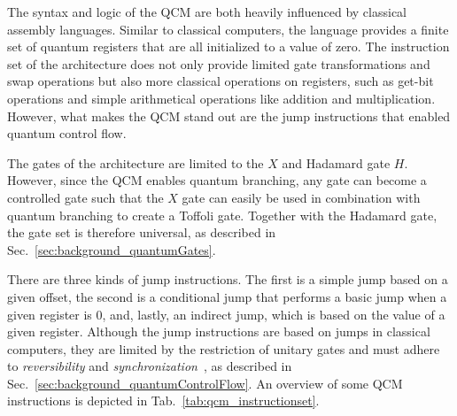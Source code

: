 The syntax and logic of the QCM are both heavily influenced by classical assembly languages. Similar to classical computers, the language provides a finite set of quantum registers that are all initialized to a value of zero. The instruction set of the architecture does not only provide limited gate transformations and swap operations but also more classical operations on registers, such as get-bit operations and simple arithmetical operations like addition and multiplication. However, what makes the QCM stand out are the jump instructions that enabled quantum control flow.

The gates of the architecture are limited to the $X$ and Hadamard gate $H$. However, since the QCM enables quantum branching, any gate can become a controlled gate such that the $X$ gate can easily be used in combination with quantum branching to create a Toffoli gate. Together with the Hadamard gate, the gate set is therefore universal, as described in Sec.~\ref{sec:background_quantumGates}.

There are three kinds of jump instructions. The first is a simple jump based on a given offset, the second is a conditional jump that performs a basic jump when a given register is $0$, and, lastly, an indirect jump, which is based on the value of a given register. Although the jump instructions are based on jumps in classical computers, they are limited by the restriction of unitary gates and must adhere to \emph{reversibility} and \emph{synchronization}~\cite{YVC24}, as described in Sec.~\ref{sec:background_quantumControlFlow}. An overview of some QCM instructions is depicted in Tab.~\ref{tab:qcm_instructionset}.

